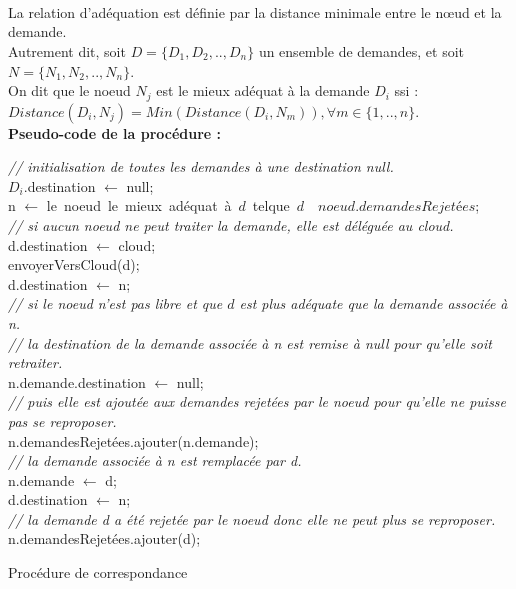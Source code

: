 \\ \\ \\
La relation d'adéquation est définie par la distance minimale entre le nœud et la demande.\\
Autrement dit, soit $D=\{D_1,D_2,..,D_n\}$ un ensemble de demandes, et soit $N=\{N_1,N_2,..,N_n\}$.\\
On dit que le noeud $N_j$ est le mieux adéquat à la demande $D_i$ ssi : \\
$Distance(D_i,N_j) = Min (Distance(D_i,N_m)), \forall m \in \{1,..,n\}$. \\
\textbf{Pseudo-code de la procédure :}\\
\begin{algorithm}[H]
  \emph{// initialisation de toutes les demandes à une destination null.}\\
  {
    $D_i$.destination $\gets$ null;\\
  }
  {
    n $\gets$ le\ noeud\ le\ mieux\ adéquat\ à\ $d$\ telque\ $d$\ \notin\ $noeud.demandesRejetées$;\\
    {
      \emph{// si aucun noeud ne peut traiter la demande, elle est déléguée au cloud.}\\
      d.destination $\gets$ cloud;\\
      envoyerVersCloud(d);\\
    }
    {
      {
        d.destination $\gets$ n;\\
      }
      {
        \emph{// si le noeud n'est pas libre et que $d$ est plus adéquate que la demande associée à n.}\\
        {
          \emph{// la destination de la demande associée à n est remise à null pour qu'elle soit retraiter.}\\
          n.demande.destination $\gets$ null;\\
          \emph{// puis elle est ajoutée aux demandes rejetées par le noeud pour qu'elle ne puisse pas se reproposer.}  \\
          n.demandesRejetées.ajouter(n.demande);\\
          \emph{// la demande associée à n est remplacée par d.}\\
          n.demande $\gets$ d;\\
          d.destination $\gets$ n;\\
        }
        {
          \emph{// la demande d a été rejetée par le noeud donc elle ne peut plus se reproposer.}\\
          n.demandesRejetées.ajouter(d);\\
        }
      }
    }
  }
  \caption{Procédure de correspondance}
\end{algorithm}

